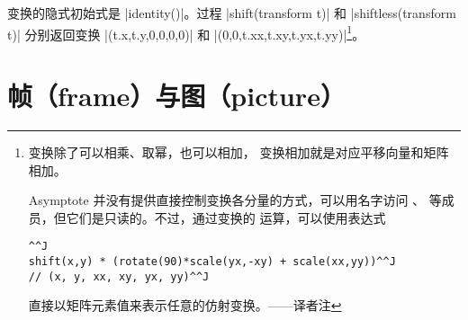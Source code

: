 \documentclass{ctexbook}
\newcommand*\prgname[1]{\textsf{#1}}
\newcommand\transnote[1]{\footnote{#1——译者注}}
\begin{document}
变换的隐式初始式是 |identity()|。过程 |shift(transform t)| 和
|shiftless(transform t)| 分别返回变换 |(t.x,t.y,0,0,0,0)| 和
|(0,0,t.xx,t.xy,t.yx,t.yy)|\transnote{变换除了可以相乘、取幂，也可以相加，
变换相加就是对应平移向量和矩阵相加。\par
\prgname{Asymptote} 并没有提供直接控制变换各分量的方式，可以用名字访问
\inlinecode{xx}、\inlinecode{xy} 等成员，但它们是只读的。不过，通过变换的
运算，可以使用表达式
\begin{lstlisting}^^J
shift(x,y) * (rotate(90)*scale(yx,-xy) + scale(xx,yy))^^J
// (x, y, xx, xy, yx, yy)^^J
\end{lstlisting}
直接以矩阵元素值来表示任意的仿射变换。}。




\section{帧（frame）与图（picture）}
\label{sec:framepicture}
\end{document}
